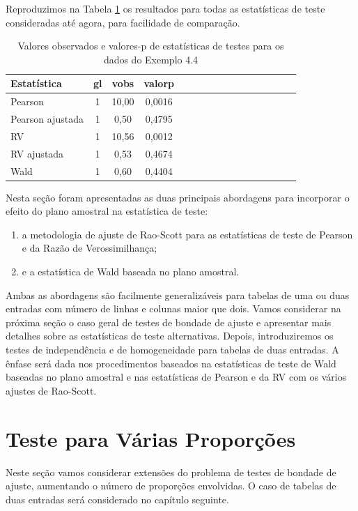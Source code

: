 \documentclass[]{book}
\theoremstyle{definition}
\theoremstyle{definition}
\theoremstyle{definition}
\theoremstyle{remark}
\begin{document}
Reproduzimos na Tabela \ref{tab:testprop} os resultados para todas as
estatísticas de teste consideradas até agora, para facilidade de
comparação.

\begin{table}

\caption{\label{tab:testprop}Valores observados e valores-p de estatísticas de testes para os dados do Exemplo 4.4}
\centering
\begin{tabular}[t]{lccclccclccclccc}
\toprule
Estatística & gl & vobs & valorp\\
\midrule
Pearson & 1 & 10,00 & 0,0016\\
Pearson ajustada & 1 & 0,50 & 0,4795\\
RV & 1 & 10,56 & 0,0012\\
RV ajustada & 1 & 0,53 & 0,4674\\
Wald & 1 & 0,60 & 0,4404\\
\bottomrule
\end{tabular}
\end{table}

Nesta seção foram apresentadas as duas principais abordagens para
incorporar o efeito do plano amostral na estatística de teste:

\begin{enumerate}
\def\labelenumi{\arabic{enumi}.}
\item
  a metodologia de ajuste de Rao-Scott para as estatísticas de teste de
  Pearson e da Razão de Verossimilhança;
\item
  e a estatística de Wald baseada no plano amostral.
\end{enumerate}

Ambas as abordagens são facilmente generalizáveis para tabelas de uma ou
duas entradas com número de linhas e colunas maior que dois. Vamos
considerar na próxima seção o caso geral de testes de bondade de ajuste
e apresentar mais detalhes sobre as estatísticas de teste alternativas.
Depois, introduziremos os testes de independência e de homogeneidade
para tabelas de duas entradas. A ênfase será dada nos procedimentos
baseados na estatísticas de teste de Wald baseadas no plano amostral e
nas estatísticas de Pearson e da RV com os vários ajustes de Rao-Scott.

\section{Teste para Várias
Proporções}\label{teste-para-varias-proporcoes}

Neste seção vamos considerar extensões do problema de testes de bondade
de ajuste, aumentando o número de proporções envolvidas. O caso de
tabelas de duas entradas será considerado no capítulo seguinte.
\end{document}
